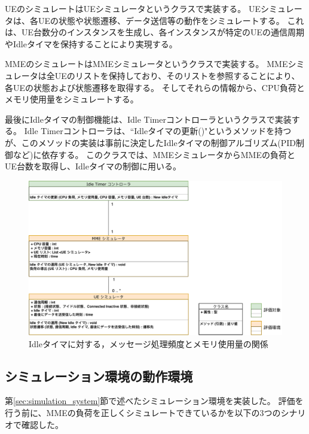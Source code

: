 \documentclass[a4j]{ujarticle}
\begin{document}
UEのシミュレートはUEシミュレータというクラスで実装する。
UEシミュレータは、各UEの状態や状態遷移、データ送信等の動作をシミュレートする。
これは、UE台数分のインスタンスを生成し、各インスタンスが特定のUEの通信周期やIdleタイマを保持することにより実現する。

MMEのシミュレートはMMEシミュレータというクラスで実装する。
MMEシミュレータは全UEのリストを保持しており、そのリストを参照することにより、各UEの状態および状態遷移を取得する。
そしてそれらの情報から、CPU負荷とメモリ使用量をシミュレートする。

最後にIdleタイマの制御機能は、Idle Timerコントローラというクラスで実装する。
Idle Timerコントローラは、``Idleタイマの更新()"というメソッドを持つが、このメソッドの実装は事前に決定したIdleタイマの制御アルゴリズム(PID制御など)に依存する。
このクラスでは、MMEシミュレータからMMEの負荷とUE台数を取得し、Idleタイマの制御に用いる。

\begin{figure}[htbp]
  \centering
  \includegraphics[width=1.0\hsize]{Simulation_UML.pdf}
  \caption{Idleタイマに対する，メッセージ処理頻度とメモリ使用量の関係}
  \label{Simulation_UML}
\end{figure}
\clearpage


\subsection{シミュレーション環境の動作環境}
\label{sec:simulation_program}
第\ref{sec:simulation_system}節で述べたシミュレーション環境を実装した。
評価を行う前に、MMEの負荷を正しくシミュレートできているかを以下の3つのシナリオで確認した。
\end{document}
